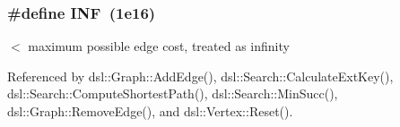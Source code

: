 \subsubsection[{\-I\-N\-F}]{\setlength{\rightskip}{0pt plus 5cm}\#define {\bf \-I\-N\-F}~(1e16)}\label{vertex_8h_a12c2040f25d8e3a7b9e1c2024c618cb6}


$<$ maximum possible edge cost, treated as infinity 



\-Referenced by dsl\-::\-Graph\-::\-Add\-Edge(), dsl\-::\-Search\-::\-Calculate\-Ext\-Key(), dsl\-::\-Search\-::\-Compute\-Shortest\-Path(), dsl\-::\-Search\-::\-Min\-Succ(), dsl\-::\-Graph\-::\-Remove\-Edge(), and dsl\-::\-Vertex\-::\-Reset().

